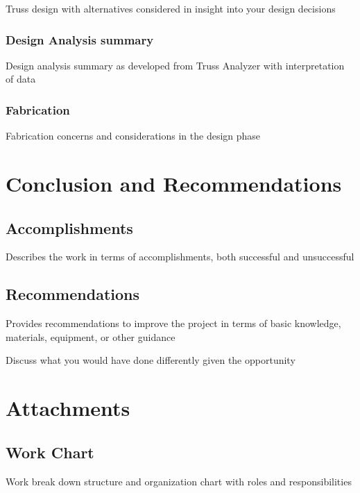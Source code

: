\documentclass{article}
\let\Oldsection\section
\renewcommand{\section}{\FloatBarrier\Oldsection}
\let\Oldsubsection\subsection
\renewcommand{\subsection}{\FloatBarrier\Oldsubsection}
\let\Oldsubsubsection\subsubsection
\renewcommand{\subsubsection}{\FloatBarrier\Oldsubsubsection}
\begin{document}
  Truss design with alternatives considered in insight into your design decisions
  
  \subsubsection{Design Analysis summary}
  
  Design analysis summary as developed from Truss Analyzer with interpretation of data
  
  \subsubsection{Fabrication}
  
  Fabrication concerns and considerations in the design phase
  
  \newpage
  
  \section{Conclusion and Recommendations}
  
  \subsection{Accomplishments}
  
  Describes the work in terms of accomplishments, both successful and unsuccessful
  
  \subsection{Recommendations}
  
  Provides recommendations to improve the project in terms of basic knowledge, materials, equipment, or other guidance
  
  Discuss what you would have done differently given the opportunity
  
  \newpage
  
  \section{Attachments}
  
  \subsection{Work Chart}
  
  Work break down structure and organization chart with roles and responsibilities
  
\end{document}
